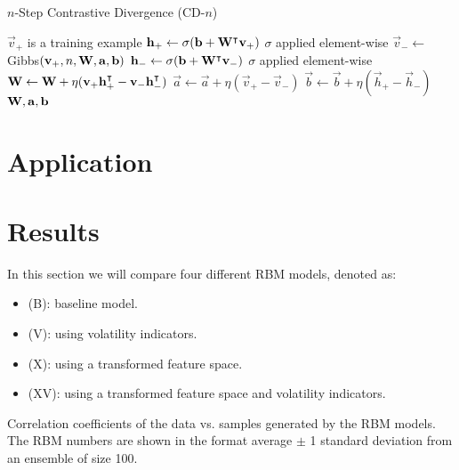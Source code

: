 \begin{algorithm}
    \caption{$n$-Step Contrastive Divergence (CD-$n$)}
\begin{algorithmic}[1]
        \Comment $\vec{v}_+$ is a training example
        \State $\mathbf{h}_+ \gets \sigma(\mathbf{b} + \mathbf{W}^\intercal\mathbf{v}_+)$
            \Comment $\sigma$ applied element-wise
        \State $\vec{v}_- \gets$ Gibbs$(\mathbf{v}_+,n,\mathbf{W},\mathbf{a},\mathbf{b})$
        \State $\mathbf{h}_- \gets \sigma(\mathbf{b} + \mathbf{W}^\intercal\mathbf{v}_-)$
            \Comment $\sigma$ applied element-wise
        \State $\mathbf{W} \gets \mathbf{W} + \eta(\mathbf{v}_+ \mathbf{h}_+^\intercal - \mathbf{v}_- \mathbf{h}_-^\intercal)$
        \State $\vec{a} \gets \vec{a} + \eta(\vec{v}_+ - \vec{v}_-)$
        \State $\vec{b} \gets \vec{b} + \eta(\vec{h}_+ - \vec{h}_-)$
        \State \Return $\mathbf{W}, \mathbf{a}, \mathbf{b}$
    \EndProcedure
\end{algorithmic}
\label{alg:CDn}
\end{algorithm}


\section{Application}

\section{Results}
In this section we will compare four different RBM models, denoted as:
\begin{itemize}
    \item (B): baseline model.
    \item (V): using volatility indicators.
    \item (X): using a transformed feature space.
    \item (XV): using a transformed feature space and volatility indicators.
\end{itemize}

\begin{table}[!htb]
    \centering
    \begin{adjustbox}{max width=\textwidth}
        
    \end{adjustbox}
    \caption{Correlation coefficients of the data vs. samples generated by the RBM models. The RBM numbers are shown in the format average \(\pm\) 1 standard deviation from an ensemble of size 100.}
    \label{tbl:rbm_correlation_coefficients}
\end{table}

